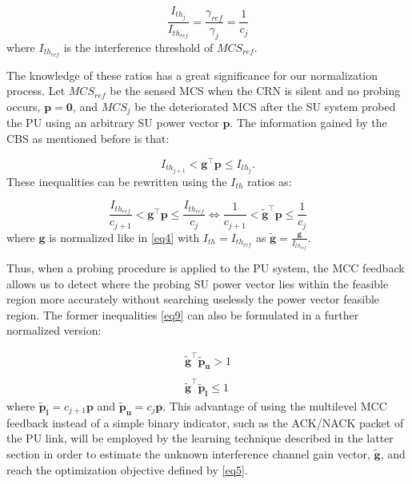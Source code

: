 \documentclass[journal]{IEEEtran}
\begin{document}
\begin{equation}
\frac{I_{th_{j}}}{I_{th_{ref}}}=\frac{\gamma_{ref}}{\gamma_{j}}=\frac{1}{c_{j}}
\label{eq7}
\end{equation}
where $I_{th_{ref}}$ is the interference threshold of $MCS_{ref}$.

The knowledge of these ratios has a great significance for our normalization process. Let $MCS_{ref}$ be the sensed MCS when the CRN is silent and no probing occurs, $\mathbf{p}=\mathbf{0}$, and $MCS_{j}$ be the deteriorated MCS after the SU system probed the PU using an arbitrary SU power vector $\mathbf{p}$. The information gained by the CBS as mentioned before is that:

\begin{equation}
I_{th_{j+1}}<\mathbf{g^\intercal}\mathbf{p}\leq I_{th_{j}}
\label{eq8}.
\end{equation}
These inequalities can be rewritten using the $I_{th}$ ratios as:

\begin{equation}
\frac{I_{th_{ref}}}{c_{j+1}}<\mathbf{g^\intercal}\mathbf{p}\leq \frac{I_{th_{ref}}}{c_{j}}\Longleftrightarrow \frac{1}{c_{j+1}}<\mathbf{\tilde{g}^\intercal}\mathbf{p}\leq \frac{1}{c_{j}}
\label{eq9}
\end{equation}
where $\mathbf{g}$ is normalized like in \eqref{eq4} with $I_{th}=I_{th_{ref}}$ as $\mathbf{\tilde{g}}=\frac{\mathbf{g}}{I_{th_{ref}}}$.

Thus, when a probing procedure is applied to the PU system, the MCC feedback allows us to detect where the probing SU power vector lies within the feasible region more accurately without searching uselessly the power vector feasible region. The former inequalities \eqref{eq9} can also be formulated in a further normalized version:

\begin{equation}
  \begin{array}{cc}
   \mathbf{\tilde{g}^\intercal}\mathbf{\tilde{p}_{u}} > 1\\ \\
   \mathbf{\tilde{g}^\intercal}\mathbf{\tilde{p}_{l}} \leq 1
  \end{array}
\label{eq10}
\end{equation}
where $\mathbf{\tilde{p}_{l}}=c_{j+1}\mathbf{p}$ and $\mathbf{\tilde{p}_{u}}=c_{j}\mathbf{p}$. This advantage of using the multilevel MCC feedback instead of a simple binary indicator, such as the ACK/NACK packet of the PU link, will be employed by the learning technique described in the latter section in order to estimate the unknown interference channel gain vector, $\mathbf{\tilde{g}}$, and reach the optimization objective defined by \eqref{eq5}.
  
\end{document}
